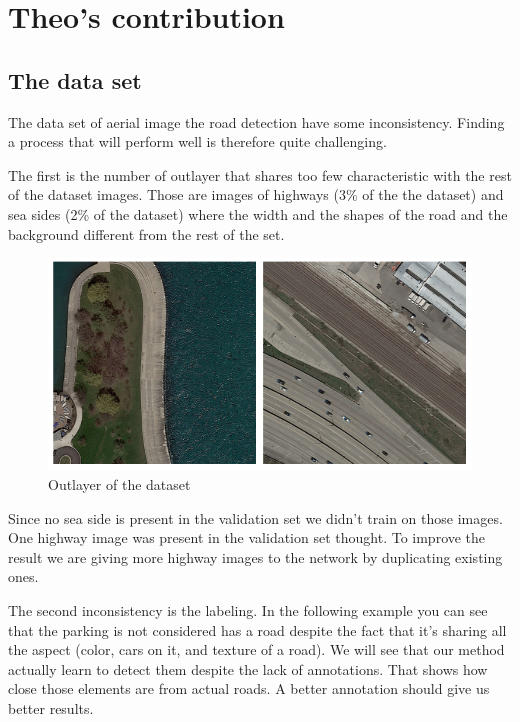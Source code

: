\documentclass[10pt,conference,compsocconf]{IEEEtran}
\begin{document}
\clearpage
\section{Theo's contribution}

\subsection{The data set}

The data set of aerial image the road detection have some inconsistency. Finding a process that will perform well is therefore quite challenging.

The first is the number of outlayer that shares too few characteristic with the rest of the dataset images. Those are images of highways (3\% of the the dataset) and sea sides (2\% of the dataset) where the width and the shapes of the road and the background different from the rest of the set.
\begin{figure}[h]
  \centering
  \includegraphics[width=\columnwidth]{img/outlayers.png}
  \caption{Outlayer of the dataset}
  \vspace{-3mm}
  \label{fig:outlayers}
\end{figure}

Since no sea side is present in the validation set we didn’t train on those images. One highway image was present in the validation set thought. To improve the result we are giving more highway images to the network by duplicating existing ones.

The second inconsistency is the labeling. In the following example you can see that the parking is not considered has a road despite the fact that it’s sharing all the aspect (color, cars on it, and texture of a road). We will see that our method actually learn to detect them despite the lack of annotations. That shows how close those elements are from actual roads. A better annotation should give us better results.
\end{document}
